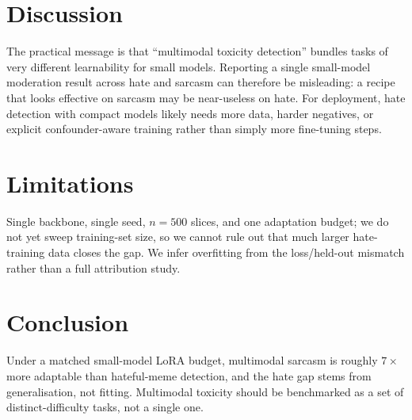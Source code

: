 \documentclass[sigconf,nonacm]{acmart}
\begin{document}
\section{Discussion}
The practical message is that ``multimodal toxicity detection'' bundles tasks of very
different learnability for small models. Reporting a single small-model moderation result
across hate and sarcasm can therefore be misleading: a recipe that looks effective on
sarcasm may be near-useless on hate. For deployment, hate detection with compact models
likely needs more data, harder negatives, or explicit confounder-aware training rather
than simply more fine-tuning steps.

\section{Limitations}
Single backbone, single seed, $n{=}500$ slices, and one adaptation budget; we do not yet
sweep training-set size, so we cannot rule out that much larger hate-training data closes
the gap. We infer overfitting from the loss/held-out mismatch rather than a full
attribution study.

\section{Conclusion}
Under a matched small-model LoRA budget, multimodal sarcasm is roughly $7\times$ more
adaptable than hateful-meme detection, and the hate gap stems from generalisation, not
fitting. Multimodal toxicity should be benchmarked as a set of distinct-difficulty tasks,
not a single one.



\end{document}
